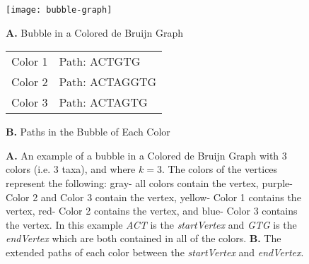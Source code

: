 \documentclass[hidelinks, 10pt, conference, compsocconf]{IEEEtran}
\begin{document}
\begin{figure}
\centering

\texttt{[image: bubble-graph]}

\begin{flushleft}
\textbf{A.} Bubble in a Colored de Bruijn Graph \\
\end{flushleft}

\begin{tabular}{cl}
{\color{yellow}Color 1} & Path: ACTGTG \\
{\color{red}Color 2} & Path: ACTAGGTG \\ 
{\color{blue}Color 3} & Path: ACTAGTG \\
\end{tabular}

\begin{flushleft}
\textbf{B.} Paths in the Bubble of Each Color \\
\end{flushleft}

\caption{\textbf{A.} An example of a bubble in a Colored de Bruijn Graph with $3$ colors (i.e. $3$ taxa), and where $k=3$.
The colors of the vertices represent the following: gray- all colors contain the vertex, purple- Color 2 and Color 3 contain the vertex, yellow- Color 1 contains the vertex, red- Color 2 contains the vertex, and blue- Color 3 contains the vertex.
In this example \textit{ACT} is the \textit{startVertex} and \textit{GTG} is the \textit{endVertex} which are both contained in all of the colors.
\textbf{B.} The extended paths of each color between the \textit{startVertex} and \textit{endVertex}.
\label{fig:bubble}}
\end{figure}
\end{document}

